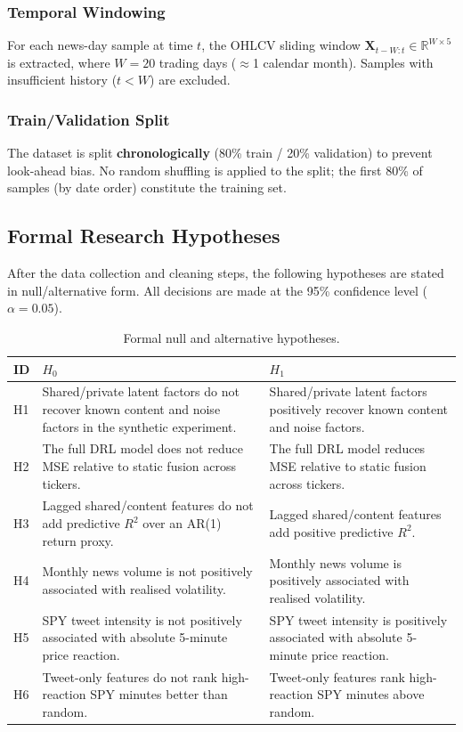\documentclass[12pt, a4paper]{article}
\begin{document}
\subsubsection{Temporal Windowing}

For each news-day sample at time $t$, the OHLCV sliding window $\mathbf{X}_{t-W:t} \in \mathbb{R}^{W \times 5}$ is extracted, where $W = 20$ trading days ($\approx$1 calendar month). Samples with insufficient history ($t < W$) are excluded.

\subsubsection{Train/Validation Split}

The dataset is split \textbf{chronologically} (80\% train / 20\% validation) to prevent look-ahead bias. No random shuffling is applied to the split; the first 80\% of samples (by date order) constitute the training set.

\subsection{Formal Research Hypotheses}

After the data collection and cleaning steps, the following hypotheses are stated in null/alternative form. All decisions are made at the 95\% confidence level ($\alpha = 0.05$).

\begin{table}[htbp]
\centering
\caption{Formal null and alternative hypotheses.}
\label{tab:hypotheses_h0_h1}
\small
\setlength{\tabcolsep}{4pt}
\begin{tabular}{lp{5.3cm}p{5.3cm}}
\toprule
\textbf{ID} & \textbf{$H_0$} & \textbf{$H_1$} \\
\midrule
H1 & Shared/private latent factors do not recover known content and noise factors in the synthetic experiment. & Shared/private latent factors positively recover known content and noise factors. \\
H2 & The full DRL model does not reduce MSE relative to static fusion across tickers. & The full DRL model reduces MSE relative to static fusion across tickers. \\
H3 & Lagged shared/content features do not add predictive $R^2$ over an AR(1) return proxy. & Lagged shared/content features add positive predictive $R^2$. \\
H4 & Monthly news volume is not positively associated with realised volatility. & Monthly news volume is positively associated with realised volatility. \\
H5 & SPY tweet intensity is not positively associated with absolute 5-minute price reaction. & SPY tweet intensity is positively associated with absolute 5-minute price reaction. \\
H6 & Tweet-only features do not rank high-reaction SPY minutes better than random. & Tweet-only features rank high-reaction SPY minutes above random. \\
\bottomrule
\end{tabular}
\end{table}
\end{document}
